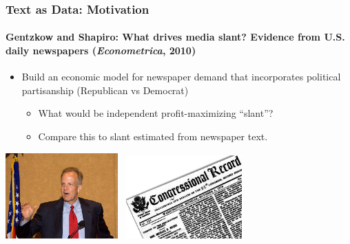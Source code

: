 \documentclass[
  shownotes,
  xcolor={svgnames},
  hyperref={colorlinks,citecolor=DarkBlue,linkcolor=DarkRed,urlcolor=DarkBlue}
  , aspectratio=169]{beamer}
\newcommand{\theme}{\color{andesred}}
\newcommand{\bk}{\color{black}}
\newcommand{\rd}{\color{red}}
\newcommand{\bl}{\color{blue}}
\newcommand{\bm}[1]{\mathbf{#1}}
\begin{document}
\begin{frame}[fragile]
\frametitle{Text as Data: Motivation}
\framesubtitle{Gentzkow and Shapiro: What drives media slant?  Evidence from
U.S. daily newspapers ({\it Econometrica}, 2010)}

\begin{itemize}
\item Build an economic model for newspaper demand that incorporates political partisanship (\rd Republican \bk vs \bl Democrat\bk)


 
\begin{itemize}
\item What would be independent profit-maximizing ``slant''?
\item Compare this to slant estimated from newspaper text.
\end{itemize}
\end{itemize}

\begin{center}
\includegraphics[width=1.7in]{figures/moran}
~\includegraphics[width=1.75in]{figures/record}
\end{center}


 \end{frame}
\end{document}
